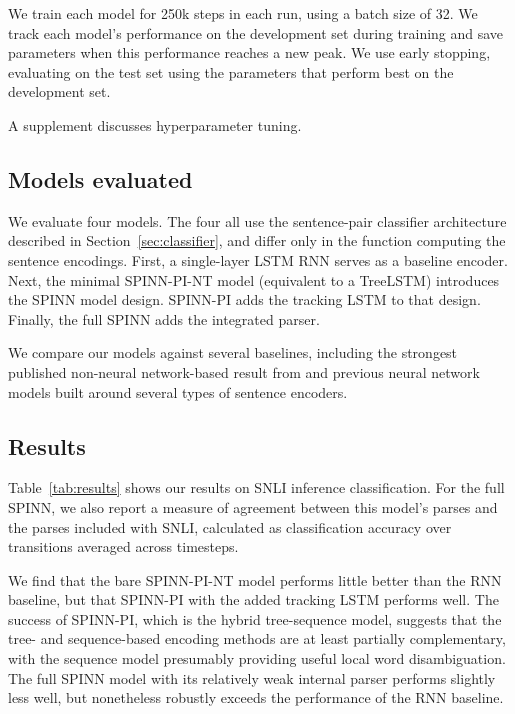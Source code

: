\documentclass[11pt]{article}
\begin{document}
We train each model for 250k steps in each run, using a batch size of 32. We track each model's performance on the development set during training and save parameters when this performance reaches a new peak. We use early stopping, evaluating on the test set using the parameters that perform best on the development set.

A supplement discusses hyperparameter tuning.

\subsection{Models evaluated}

We evaluate four models. The four all use the sentence-pair classifier architecture described in Section~\ref{sec:classifier}, and differ only in the function computing the sentence encodings. First, a single-layer LSTM RNN \citep[similar to that of][]{snli:emnlp2015} serves as a baseline encoder. Next, the minimal SPINN-PI-NT model (equivalent to a TreeLSTM) introduces the SPINN model design. SPINN-PI adds the tracking LSTM to that design. Finally, the full SPINN adds the integrated parser.

We compare our models against several baselines, including the strongest published non-neural network-based result from \citet{snli:emnlp2015} and previous neural network models built around several types of sentence encoders.

\subsection{Results}

Table~\ref{tab:results} shows our results on SNLI inference classification. For the full SPINN, we also report a measure of agreement between this model's parses and the parses included with SNLI, calculated as classification accuracy over transitions averaged across timesteps.

We find that the bare SPINN-PI-NT model performs little better than the RNN baseline, but that SPINN-PI with the added tracking LSTM performs well. The success of SPINN-PI, which is the hybrid tree-sequence model, suggests that the tree- and sequence-based encoding methods are at least partially complementary, with the sequence model presumably providing useful local word disambiguation. The full SPINN model with its relatively weak internal parser performs slightly less well, but nonetheless robustly exceeds the performance of the RNN baseline.
\end{document}
